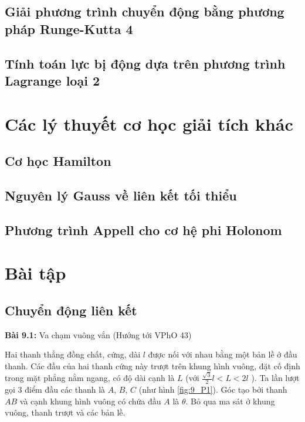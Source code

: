 
\subsection{Giải phương trình chuyển động bằng phương pháp Runge-Kutta 4}

\subsection{Tính toán lực bị động dựa trên phương trình Lagrange loại 2}

\section{Các lý thuyết cơ học giải tích khác}

\subsection{Cơ học Hamilton}

\subsection{Nguyên lý Gauss về liên kết tối thiểu}

\subsection{Phương trình Appell cho cơ hệ phi Holonom}


\section{Bài tập}

\subsection*{Chuyển động liên kết}

\textbf{Bài 9.1:} Va chạm vuông vắn (Hướng tới VPhO 43)

Hai thanh thẳng đồng chất, cứng, dài \(l\) được nối với nhau bằng một bản lề ở đầu thanh. 
Các đầu của hai thanh cứng này trượt trên khung hình vuông, đặt cố định trong mặt phẳng nằm ngang, có độ dài cạnh là \(L\) (với \(\frac{\sqrt{3}}{2}l<L<2l\) ). 
Ta lần lượt gọi 3 điểm đầu các thanh là \(A\), \(B\), \(C\) (như hình \ref{fig:9_P1}). Góc tạo bởi thanh \(AB\) và cạnh khung hình vuông có chứa đầu \(A\) là \(\theta\). Bỏ qua ma sát ở khung vuông, thanh trượt và các bản lề.

